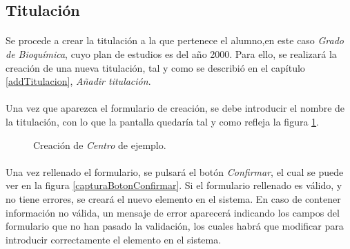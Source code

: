 \subsection{Titulación}

  \paragraph{}Se procede a crear la titulación a la que pertenece el alumno,en
  este caso \textit{Grado de Bioquímica}, cuyo plan de estudios es del año 2000.
  Para ello, se realizará la creación de una nueva titulación, tal y como se
  describió en el capítulo \ref{addTitulacion}, \textit{Añadir titulación}.

  \paragraph{}Una vez que aparezca el formulario de creación, se debe introducir
  el nombre de la titulación, con lo que la pantalla quedaría tal y como refleja
  la figura \ref{ejemploAddTitulacion}.

  \begin{figure}[!ht]
    \begin{center}
      \caption{Creación de \textit{Centro} de ejemplo.}
      \label{ejemploAddTitulacion}
    \end{center}
  \end{figure}

  \paragraph{}Una vez rellenado el formulario, se pulsará el botón
  \textit{Confirmar}, el cual se puede ver en la figura
  \ref{capturaBotonConfirmar}. Si el formulario rellenado es válido, y no tiene
  errores, se creará el nuevo elemento en el sistema. En caso de contener
  información no válida, un mensaje de error aparecerá indicando los campos
  del formulario que no han pasado la validación, los cuales habrá que modificar
  para introducir correctamente el elemento en el sistema.
